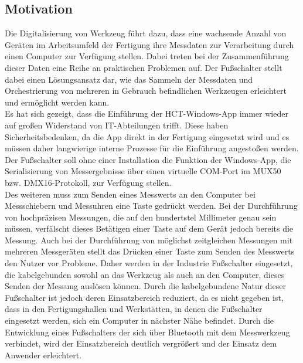 \subsection{Motivation}
Die Digitalisierung von Werkzeug führt dazu, dass eine wachsende Anzahl von Geräten im Arbeitsumfeld der Fertigung ihre Messdaten zur Verarbeitung durch einen Computer zur Verfügung stellen. Dabei treten bei der Zusammenführung dieser Daten eine Reihe an praktischen Problemen auf. Der Fußschalter stellt dabei einen Lösungsansatz dar, wie das Sammeln der Messdaten und Orchestrierung von mehreren in Gebrauch befindlichen Werkzeugen erleichtert und ermöglicht werden kann.\\
Es hat sich gezeigt, dass die Einführung der \ac{HCT}-Windows-App immer wieder auf großen Widerstand von IT-Abteilungen trifft. Diese haben Sicherheitsbedenken, da die App direkt in der Fertigung eingesetzt wird und es müssen daher langwierige interne Prozesse für die Einführung angestoßen werden. Der Fußschalter soll ohne einer Installation die Funktion der Windows-App, die Serialisierung von Messergebnisse über einen virtuelle COM-Port im MUX50 bzw. DMX16-Protokoll, zur Verfügung stellen. \\
Des weiteren muss zum Senden eines Messwerts an den Computer bei Messschiebern und Messuhren eine Taste gedrückt werden. Bei der Durchführung von hochpräzisen Messungen, die auf den hundertstel Millimeter genau sein müssen, verfälscht dieses Betätigen einer Taste auf dem Gerät jedoch bereits die Messung. Auch bei der Durchführung von möglichst zeitgleichen Messungen mit mehreren Messgeräten stellt das Drücken einer Taste zum Senden des Messwerts den Nutzer vor Probleme. Daher werden in der Industrie Fußschalter eingesetzt, die kabelgebunden sowohl an das Werkzeug als auch an den Computer, dieses Senden der Messung auslösen können. Durch die kabelgebundene Natur dieser Fußschalter ist jedoch deren Einsatzbereich reduziert, da es nicht gegeben ist, dass in den Fertigungshallen und Werkstätten, in denen die Fußschalter eingesetzt werden, sich ein Computer in nächster Nähe befindet. Durch die Entwicklung eines Fußschalters der sich über Bluetooth mit dem Messwerkzeug verbindet, wird der Einsatzbereich deutlich vergrößert und der Einsatz dem Anwender erleichtert.